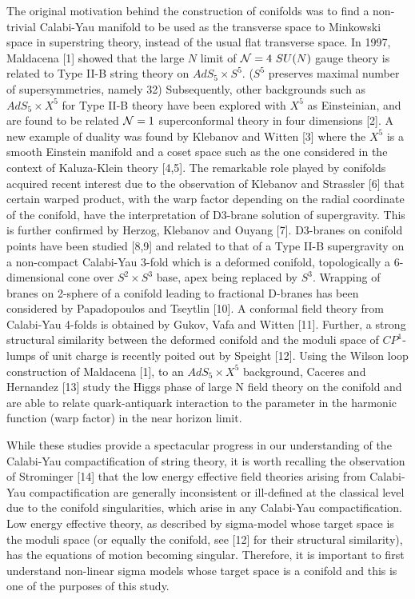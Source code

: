 \documentclass[a4paper,12pt]{article}
\begin{document}
{The original motivation behind the construction of conifolds was to find a non-trivial Calabi-Yau manifold to be used as the transverse space to Minkowski space in superstring theory, instead of the usual flat transverse space. In 1997, Maldacena [1] showed that the large $N$ limit of ${\cal{N}}=4\ SU(N)$ gauge theory
is related to Type II-B string theory on $AdS_5\times S^5$. ($S^5$ 
preserves maximal number of supersymmetries, namely 32) Subsequently, other
backgrounds such as $AdS_5\times X^5$ for Type II-B theory have been explored 
with $X^5$ as Einsteinian, and are found to be related ${\cal{N}}=1$ superconformal theory in four dimensions [2]. A new example of duality was found by Klebanov and Witten [3] where the $X^5$ is a smooth Einstein manifold and a coset 
space such as the one considered in the context of Kaluza-Klein theory [4,5].
The
remarkable role played by conifolds acquired recent interest due to the 
observation of Klebanov and Strassler [6] that certain warped product, with
the warp factor depending on the radial coordinate of the conifold, have the 
interpretation of D3-brane solution of supergravity. This is further confirmed
by Herzog, Klebanov and Ouyang [7]. D3-branes on conifold points have been
studied [8,9] and related to that of a Type II-B supergravity on a 
non-compact Calabi-Yau 3-fold which is a deformed conifold, topologically
a 6-dimensional cone over $S^2\times S^3$ base, apex being replaced by $S^3$.
Wrapping of branes on 2-sphere of a conifold leading to fractional D-branes
has been considered by Papadopoulos and Tseytlin [10]. A conformal field theory  from Calabi-Yau 4-folds is obtained by Gukov, Vafa and Witten [11]. Further,
a strong structural similarity between the deformed conifold and 
the moduli space of $CP^1$-lumps
of unit charge is recently poited out by Speight [12]. Using the Wilson loop 
construction of Maldacena [1], to an $AdS_5\times X^5$ background, Caceres
and Hernandez [13] study the Higgs phase of large N field theory on the conifold and are able to relate quark-antiquark interaction to the parameter in the
harmonic function (warp factor) in the near horizon limit. 

\vspace{0.5cm}

While these studies provide a spectacular progress in our understanding of
the Calabi-Yau compactification of string theory, it is worth recalling the
observation of Strominger [14] that the low energy effective field theories
arising from Calabi-Yau compactification are generally inconsistent or 
ill-defined at the classical level due to the conifold singularities, which
arise in any Calabi-Yau compactification. Low energy effective theory, as
described by sigma-model whose target space is the moduli space (or equally the
conifold, see [12] for their structural similarity), has the equations of motion becoming singular. Therefore, it is important to first understand non-linear
sigma models whose target space is a conifold and this is one of the purposes of 
this study. 

}
\end{document}
